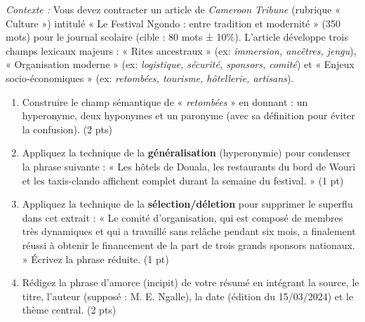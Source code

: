 \documentclass[11pt]{article}
\begin{document}
\begin{exercice}
    \textit{Contexte :} Vous devez contracter un article de \textit{Cameroon Tribune} (rubrique « Culture ») intitulé « Le Festival Ngondo : entre tradition et modernité » (350 mots) pour le journal scolaire (cible : 80 mots ± 10\%). L'article développe trois champs lexicaux majeurs : « Rites ancestraux » (ex: \textit{immersion, ancêtres, jengu}), « Organisation moderne » (ex: \textit{logistique, sécurité, sponsors, comité}) et « Enjeux socio-économiques » (ex: \textit{retombées, tourisme, hôtellerie, artisans}).
    \begin{enumerate}
        \item Construire le champ sémantique de « \textit{retombées} » en donnant : un hyperonyme, deux hyponymes et un paronyme (avec sa définition pour éviter la confusion). (2 pts)
        \item Appliquez la technique de la \textbf{généralisation} (hyperonymie) pour condenser la phrase suivante : « Les hôtels de Douala, les restaurants du bord de Wouri et les taxis-clando affichent complet durant la semaine du festival. » (1 pt)
        \item Appliquez la technique de la \textbf{sélection/déletion} pour supprimer le superflu dans cet extrait : « Le comité d'organisation, qui est composé de membres très dynamiques et qui a travaillé sans relâche pendant six mois, a finalement réussi à obtenir le financement de la part de trois grands sponsors nationaux. » Écrivez la phrase réduite. (1 pt)
        \item Rédigez la phrase d'amorce (incipit) de votre résumé en intégrant la source, le titre, l'auteur (supposé : M. E. Ngalle), la date (édition du 15/03/2024) et le thème central. (2 pts)
    \end{enumerate}
\end{exercice}
\end{document}
